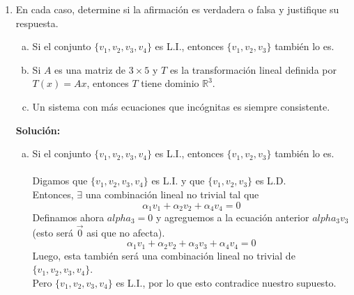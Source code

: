 \documentclass[12pt]{article}
\newenvironment{solucion}
{\begin{mdframed}[backgroundcolor=black!10]
		{\bf Solución:}\\
	}
	{
	\end{mdframed}
}
\newenvironment{preguntas}
{\begin{enumerate}\itemsep12pt
	}
	{
	\end{enumerate}
}
\newcommand{\R}{\mathbb{R}}
\begin{document}
\begin{preguntas}
\begin{solucion}
\begin{enumerate}[a)]
Luego,
$$c_{23} = \begin{pmatrix}
(-2)^{2+1}\\ (-2)^{2+2}
\end{pmatrix} \cdot
\begin{pmatrix}
(-3)^{1-3}\\ (-3)^{2-3}
\end{pmatrix} = 
\begin{pmatrix}
-8\\ 16
\end{pmatrix} \cdot
\begin{pmatrix}
\frac{1}{9}\\ -\frac{1}{3}
\end{pmatrix}=
-8 \cdot \dfrac{1}{9} + 16 \cdot -\dfrac{1}{3} = -\dfrac{56}{9}
$$
\end{enumerate}
\end{solucion}
\item En cada caso, determine si la afirmación es verdadera o falsa y justifique su respuesta.
\begin{enumerate}[a)]
\item Si el conjunto $\{v_1, v_2, v_3, v_4\}$ es L.I., entonces $\{v_1, v_2, v_3\}$ también lo es.
\item Si $A$ es una matriz de $3\times 5$ y $T$ es la transformación lineal definida por $T(x) = Ax$, entonces $T$ tiene dominio $\R^3$.
\item Un sistema con más ecuaciones que incógnitas es siempre consistente.
\end{enumerate}
\begin{solucion}

\begin{enumerate}[a)]
\item Si el conjunto $\{v_1, v_2, v_3, v_4\}$ es L.I., entonces $\{v_1, v_2, v_3\}$ también lo es.\\
			\\
			Digamos que $\{v_1, v_2, v_3, v_4\}$ es L.I. y que $\{v_1, v_2, v_3\}$ es L.D.\\
			Entonces, $\exists$ una combinación lineal no trivial tal que 
			$$\alpha_1 v_1 + \alpha_2 v_2 + \alpha_4 v_4 = 0$$
			Definamos ahora $alpha_3 = 0$ y agreguemos a la ecuación anterior $alpha_3 v_3$ (esto será $\vec{0}$ asi que no afecta).\\
			$$\alpha_1 v_1 + \alpha_2 v_2 + \alpha_3 v_3 + \alpha_4 v_4 = 0$$
			Luego, esta también será una combinación lineal no trivial de $\{v_1, v_2, v_3, v_4\}$.\\
			Pero $\{v_1, v_2, v_3, v_4\}$ es L.I., por lo que esto contradice nuestro supuesto.
			

\end{enumerate}
\end{solucion}
\end{preguntas}
\end{document}
